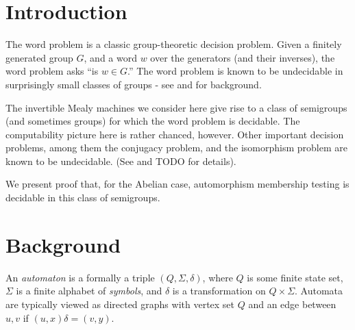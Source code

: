 \documentclass[10pt]{article}
\newcommand{\defn}[1]{\textit{#1}}
\begin{document}
\pagestyle{plain}
\title{\rmfamily\normalfont{}} \author{} \date{May 5, 2017}

\maketitle

\begin{abstract}
  We consider a variety of decision problems in groups and semigroups
  induced by invertible Mealy machines. Notably, we present proof that
  the automorphism membership problem in decidable in these
  semigroups. In addition, we prove undecidability of a Knapsack
  variant. A discussion of iteration and orbit rationality follows.
\end{abstract}

\tableofcontents

\section{Introduction}
The word problem is a classic group-theoretic decision problem. Given
a finitely generated group $G$, and a word $w$ over the generators
(and their inverses), the word problem asks ``is $w \in G$.'' The word
problem is known to be undecidable in surprisingly small classes of
groups - see \cite{Cain09:auto_sg} and \cite{Cain09:dec_prob} for background.

The invertible Mealy machines we consider here give rise to a class of
semigroups (and sometimes groups) for which the word problem is
decidable. The computability picture here is rather chanced,
however. Other important decision problems, among them the conjugacy
problem, and the isomorphism problem are known to be undecidable. (See
\cite{sunic:conj} and TODO for details).

We present proof that, for the Abelian case, automorphism membership
testing is decidable in this class of semigroups.

\section{Background}
An \defn{automaton} is a formally a triple $(Q, \Sigma, \delta)$,
where $Q$ is some finite state set, $\Sigma$ is a finite alphabet of
\defn{symbols}, and $\delta$ is a transformation on $Q \times \Sigma$.
Automata are typically viewed as directed graphs with vertex set $Q$
and an edge between $u, v$ if $(u, x)\delta = (v, y)$.
\end{document}
